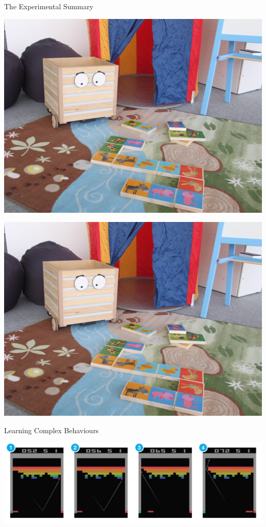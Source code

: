 \documentclass[compress]{beamer}
\begin{document}
{{\begin{frame}{The Experimental Summary}
\begin{multicols}{4}
        \includegraphics[width=\columnwidth]{ranger-background}

        \includegraphics[width=\columnwidth]{ranger-background}
    \end{multicols}


\end{frame}

{
\begin{frame}{Learning Complex Behaviours}

    \begin{center}
        \includegraphics[width=\linewidth]{breakout}
    \end{center}



\end{frame}}}}
\end{document}
